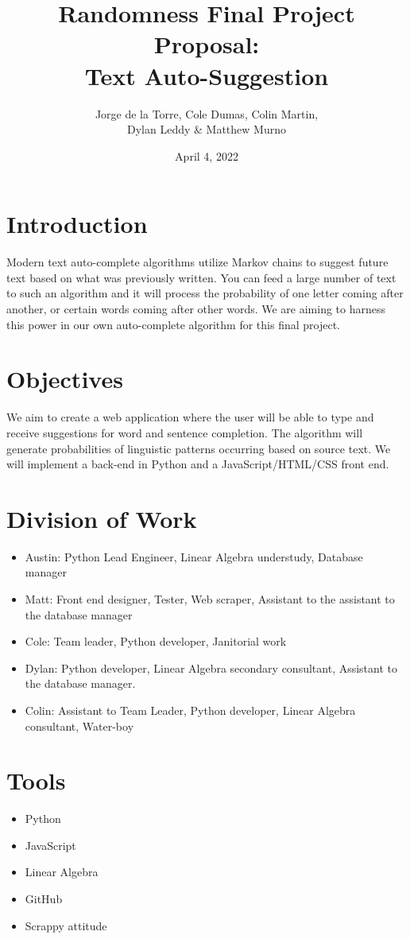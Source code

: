 \documentclass{article}
\title{Randomness Final Project Proposal: \\ Text Auto-Suggestion}
\author{Jorge de la Torre, Cole Dumas, Colin Martin, \\ Dylan Leddy \& Matthew Murno}
\date{April 4, 2022}
\begin{document}
\maketitle
\section{Introduction}
Modern text auto-complete algorithms utilize Markov chains to suggest future text based on what was previously written. You can feed a large number of text to such an algorithm and it will process the probability of one letter coming after another, or certain words coming after other words. We are aiming to harness this power in our own auto-complete algorithm for this final project.

\section{Objectives}
We aim to create a web application where the user will be able to type and receive suggestions for word and sentence completion. The algorithm will generate probabilities of linguistic patterns occurring based on source text. We will implement a back-end in Python and a JavaScript/HTML/CSS front end.

\section{Division of Work}
\begin{itemize}
  \item Austin: Python Lead Engineer, Linear Algebra understudy, Database manager 
  \item Matt: Front end designer, Tester, Web scraper, Assistant to the assistant to the database manager
  \item Cole: Team leader, Python developer, Janitorial work
  \item Dylan: Python developer, Linear Algebra secondary consultant, Assistant to the database manager.
  \item Colin: Assistant to Team Leader, Python developer, Linear Algebra consultant, Water-boy
\end{itemize}
\section{Tools}
\begin{itemize}
  \item Python
  \item JavaScript
  \item Linear Algebra
  \item GitHub
  \item Scrappy attitude
\end{itemize}
\end{document}
